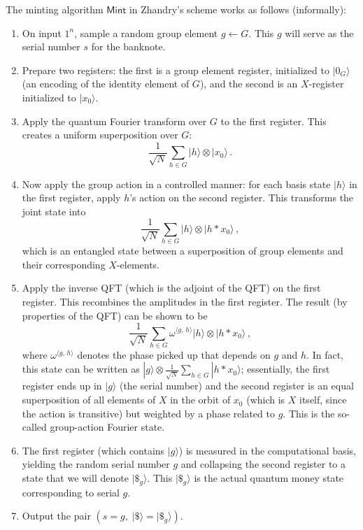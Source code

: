 \documentclass[11pt]{article}
\theoremstyle{definition}
\begin{document}
The minting algorithm $\mathsf{Mint}$ in Zhandry’s scheme works as follows (informally):
\begin{enumerate}
    \item On input $1^n$, sample a random group element $g \leftarrow G$. This $g$ will serve as the serial number $s$ for the banknote.
    \item Prepare two registers: the first is a group element register, initialized to $|0_G\rangle$ (an encoding of the identity element of $G$), and the second is an $X$-register initialized to $|x_0\rangle$.
    \item Apply the quantum Fourier transform over $G$ to the first register. This creates a uniform superposition over $G$: 
    \[
    \frac{1}{\sqrt{N}} \sum_{h \in G} |h\rangle \otimes |x_0\rangle\,.
    \] 
    \item Now apply the group action in a controlled manner: for each basis state $|h\rangle$ in the first register, apply $h$’s action on the second register. This transforms the joint state into 
    \[
    \frac{1}{\sqrt{N}} \sum_{h \in G} |h\rangle \otimes |h * x_0\rangle\,,
    \] 
    which is an entangled state between a superposition of group elements and their corresponding $X$-elements.
    \item Apply the inverse QFT (which is the adjoint of the QFT) on the first register. This recombines the amplitudes in the first register. The result (by properties of the QFT) can be shown to be 
    \[
    \frac{1}{\sqrt{N}} \sum_{h \in G} \omega^{\langle g,\,h \rangle} |h\rangle \otimes |h * x_0\rangle\,,
    \] 
    where $\omega^{\langle g,\,h \rangle}$ denotes the phase picked up that depends on $g$ and $h$. In fact, this state can be written as $|g\rangle \otimes \frac{1}{\sqrt{N}}\sum_{h \in G} |h * x_0\rangle$; essentially, the first register ends up in $|g\rangle$ (the serial number) and the second register is an equal superposition of all elements of $X$ in the orbit of $x_0$ (which is $X$ itself, since the action is transitive) but weighted by a phase related to $g$. This is the so-called group-action Fourier state.
    \item The first register (which contains $|g\rangle$) is measured in the computational basis, yielding the random serial number $g$ and collapsing the second register to a state that we will denote $|\$_g\rangle$. This $|\$_g\rangle$ is the actual quantum money state corresponding to serial $g$.
    \item Output the pair $(s = g,\; |\$\rangle = |\$_g\rangle)$.
\end{enumerate}
\end{document}
